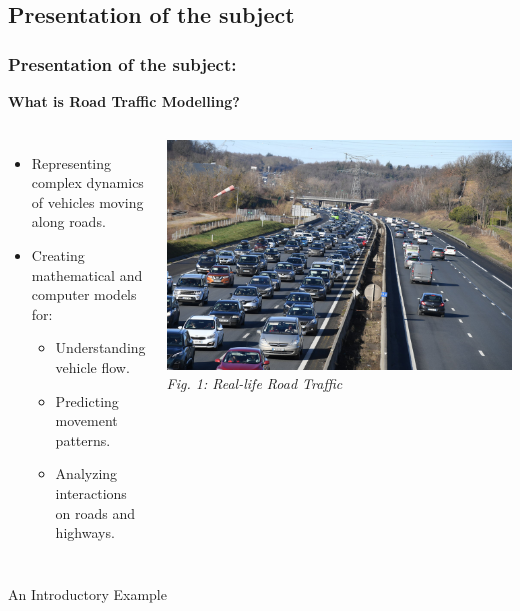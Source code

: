 \documentclass{beamer}
\begin{document}
\begin{frame}
        \subsection{Presentation of the subject}
	\frametitle{Presentation of the subject:}
        \begin{center}
        \textbf{What is Road Traffic Modelling?}
         \end{center}
	
        
	\begin{columns}
		\begin{itemize}
			\item Representing complex dynamics of vehicles moving along roads.
			\item Creating mathematical and computer models for:
			\begin{itemize}
				\item Understanding vehicle flow.
				\item Predicting movement patterns.
				\item Analyzing interactions on roads and highways.
			\end{itemize}
		\end{itemize}
		
		\begin{center}
			\includegraphics[width=\textwidth]{PIC1.jpg}
			\tiny{\textit{Fig. 1: Real-life Road Traffic}}
		\end{center}
	\end{columns}
\end{frame}

\begin{frame}{An Introductory Example}
	\centering
\end{frame}
\end{document}
